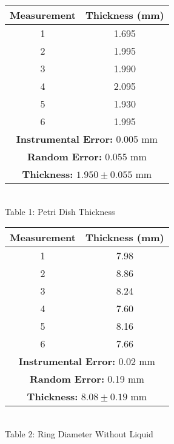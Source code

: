 \begin{center}
    \begin{minipage}{.5\linewidth}
        \centering
        \begin{tabular}{|c | c|}
            \hline
            \textbf{Measurement} & \textbf{Thickness (mm)}  \\ \hline
            1 & 1.695 \\ 
            2 & 1.995 \\ 
            3 & 1.990  \\ 
            4 & 2.095 \\ 
            5 & 1.930 \\ 
            6 & 1.995 \\ \hline
            \multicolumn{2}{|c|}{\textbf{Instrumental Error:} 0.005 mm} \\
            \multicolumn{2}{|c|}{\textbf{Random Error:} 0.055 mm} \\
            \multicolumn{2}{|c|}{\textbf{Thickness:} $1.950\pm0.055$ mm} \\ \hline
        \end{tabular}
        \vspace{3mm}
        \\Table 1: Petri Dish Thickness
        \vspace{10mm}
    \end{minipage}%
    \begin{minipage}{.5\linewidth}
        \centering
        \begin{tabular}{|c | c|}
            \hline
            \textbf{Measurement} & \textbf{Thickness (mm)}  \\ \hline
            1 & 7.98 \\ 
            2 & 8.86 \\ 
            3 & 8.24  \\ 
            4 & 7.60 \\ 
            5 & 8.16 \\ 
            6 & 7.66 \\ \hline
            \multicolumn{2}{|c|}{\textbf{Instrumental Error:} 0.02 mm} \\
            \multicolumn{2}{|c|}{\textbf{Random Error:} 0.19 mm} \\
            \multicolumn{2}{|c|}{\textbf{Thickness:} $8.08\pm0.19$ mm} \\ \hline
        \end{tabular}
        \vspace{3mm}
        \\Table 2: Ring Diameter Without Liquid

\end{minipage}
\end{center}
